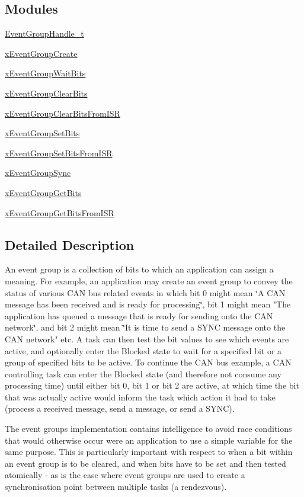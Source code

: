 \subsection*{Modules}
\begin{DoxyCompactItemize}
\item 
\hyperlink{group___event_group_handle__t}{Event\+Group\+Handle\+\_\+t}
\item 
\hyperlink{group__x_event_group_create}{x\+Event\+Group\+Create}
\item 
\hyperlink{group__x_event_group_wait_bits}{x\+Event\+Group\+Wait\+Bits}
\item 
\hyperlink{group__x_event_group_clear_bits}{x\+Event\+Group\+Clear\+Bits}
\item 
\hyperlink{group__x_event_group_clear_bits_from_i_s_r}{x\+Event\+Group\+Clear\+Bits\+From\+I\+SR}
\item 
\hyperlink{group__x_event_group_set_bits}{x\+Event\+Group\+Set\+Bits}
\item 
\hyperlink{group__x_event_group_set_bits_from_i_s_r}{x\+Event\+Group\+Set\+Bits\+From\+I\+SR}
\item 
\hyperlink{group__x_event_group_sync}{x\+Event\+Group\+Sync}
\item 
\hyperlink{group__x_event_group_get_bits}{x\+Event\+Group\+Get\+Bits}
\item 
\hyperlink{group__x_event_group_get_bits_from_i_s_r}{x\+Event\+Group\+Get\+Bits\+From\+I\+SR}
\end{DoxyCompactItemize}


\subsection{Detailed Description}
An event group is a collection of bits to which an application can assign a meaning. For example, an application may create an event group to convey the status of various C\+AN bus related events in which bit 0 might mean \char`\"{}\+A C\+A\+N
message has been received and is ready for processing\char`\"{}, bit 1 might mean "The application has queued a message that is ready for sending onto the C\+AN network\char`\"{}, and bit 2 might mean \char`\"{}It is time to send a S\+Y\+NC message onto the C\+AN network" etc. A task can then test the bit values to see which events are active, and optionally enter the Blocked state to wait for a specified bit or a group of specified bits to be active. To continue the C\+AN bus example, a C\+AN controlling task can enter the Blocked state (and therefore not consume any processing time) until either bit 0, bit 1 or bit 2 are active, at which time the bit that was actually active would inform the task which action it had to take (process a received message, send a message, or send a S\+Y\+NC).

The event groups implementation contains intelligence to avoid race conditions that would otherwise occur were an application to use a simple variable for the same purpose. This is particularly important with respect to when a bit within an event group is to be cleared, and when bits have to be set and then tested atomically -\/ as is the case where event groups are used to create a synchronisation point between multiple tasks (a \textquotesingle{}rendezvous\textquotesingle{}). 